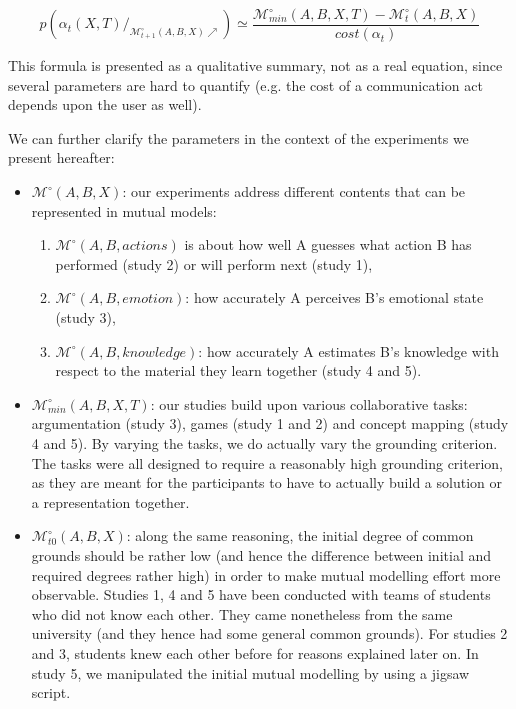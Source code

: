 \documentclass[natbib]{svjour3}
\newcommand{\eg}{e.g.\xspace}
\newcommand{\A}{A\xspace}
\newcommand{\B}{B\xspace}
\newcommand{\Model}[3]{{$\mathcal{M}^{\circ}(#1, #2, #3)$}}
\begin{document}
\begin{equation}\label{eq:probrepair}
    p(\alpha_{t}(X,T) /_{\mathcal{M}^{\circ}_{t+1}(A,B,X)\nearrow}) \simeq
    \frac{\mathcal{M}^{\circ}_{min}(A,B,X,T) -
    \mathcal{M}^{\circ}_{t}(A,B,X)}{cost (\alpha_{t})}
\end{equation}

This formula is presented as a qualitative summary, not as a real equation,
since several parameters are hard to quantify (\eg the cost of a communication
act depends upon the user as well).

We can further clarify the parameters in the context of the experiments we
present hereafter:

\begin{itemize}
    \item \Model{A}{B}{X}: our experiments address different contents that can be
        represented in mutual models:

    \begin{enumerate}

        \item \Model{A}{B}{actions} is about how well \A guesses what action \B has
            performed (study 2) or will perform next (study 1),

        \item \Model{A}{B}{emotion}: how accurately \A perceives \B's emotional state
            (study 3),

        \item \Model{A}{B}{knowledge}: how accurately \A estimates \B's knowledge
            with respect to the material they learn together (study 4 and 5).

    \end{enumerate}
        \vspace{1em}

    \item $\mathcal{M}^{\circ}_{min}(A,B,X,T)$: our studies build upon various
        collaborative tasks: argumentation (study 3), games (study 1 and 2) and
        concept mapping (study 4 and 5). By varying the tasks, we do actually
        vary the grounding criterion. The tasks were all designed to require a reasonably high
        grounding criterion, as they are meant for the participants to have to
        actually build a solution or a representation together.
        \vspace{1em}

    \item $\mathcal{M}^{\circ}_{t0}(A,B,X)$: along the same reasoning, the initial degree
        of common grounds should be rather low (and hence the difference between
        initial and required degrees rather high) in order to make mutual
        modelling effort more observable. Studies 1, 4 and 5 have been conducted
        with teams of students who did not know each other. They came
        nonetheless from the same university (and they hence had some general common
        grounds).  For studies 2 and 3, students knew each other before for
        reasons explained later on. In study 5, we manipulated the initial mutual modelling by
        using a {\sc jigsaw} script.
        \vspace{1em}


\end{itemize}
\end{document}
